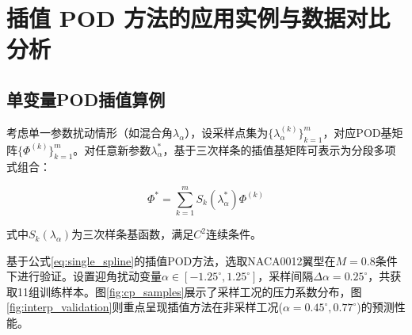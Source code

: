 \chapter{插值 POD 方法的应用实例与数据对比分析}
\label{cha:usage-example}

\section{单变量POD插值算例}
\label{sec:single_variable_pod}
考虑单一参数扰动情形（如混合角$\lambda_\alpha$），设采样点集为$\{\lambda_{\alpha}^{(k)}\}_{k=1}^m$，对应POD基矩阵$\{\Phi^{(k)}\}_{k=1}^m$。对任意新参数$\lambda_\alpha^*$，基于三次样条的插值基矩阵可表示为分段多项式组合：

\begin{equation}
    \Phi^* = \sum_{k=1}^m S_k(\lambda_\alpha^*) \Phi^{(k)}
    \label{eq:single_spline}
\end{equation}

式中$S_k(\lambda_\alpha)$为三次样条基函数，满足$C^2$连续条件。

基于公式\eqref{eq:single_spline}的插值POD方法，选取NACA0012翼型在$M=0.8$条件下进行验证。设置迎角扰动变量$\alpha\in[-1.25^\circ,1.25^\circ]$，采样间隔$\Delta\alpha=0.25^\circ$，共获取11组训练样本。图\ref{fig:cp_samples}展示了采样工况的压力系数分布，图\ref{fig:interp_validation}则重点呈现插值方法在非采样工况($\alpha=0.45^\circ,0.77^\circ$)的预测性能。

